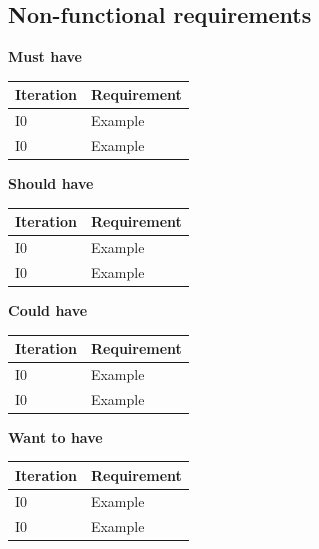 \subsection{Non-functional requirements}
\textbf{Must have}
\begin{table}[H]
\begin{tabular}{|l|l|}
\hline
Iteration & Requirement \\ \hline
I0        & Example     \\ \hline
I0        & Example     \\ \hline
\end{tabular}
\end{table}
\noindent
\textbf{Should have}
\begin{table}[H]
\begin{tabular}{|l|l|}
\hline
Iteration & Requirement \\ \hline
I0        & Example     \\ \hline
I0        & Example     \\ \hline
\end{tabular}
\end{table}
\noindent
\textbf{Could have}
\begin{table}[H]
\begin{tabular}{|l|l|}
\hline
Iteration & Requirement \\ \hline
I0        & Example     \\ \hline
I0        & Example     \\ \hline
\end{tabular}
\end{table}
\noindent
\textbf{Want to have}
\begin{table}[H]
\begin{tabular}{|l|l|}
\hline
Iteration & Requirement \\ \hline
I0        & Example     \\ \hline
I0        & Example     \\ \hline
\end{tabular}
\end{table}

